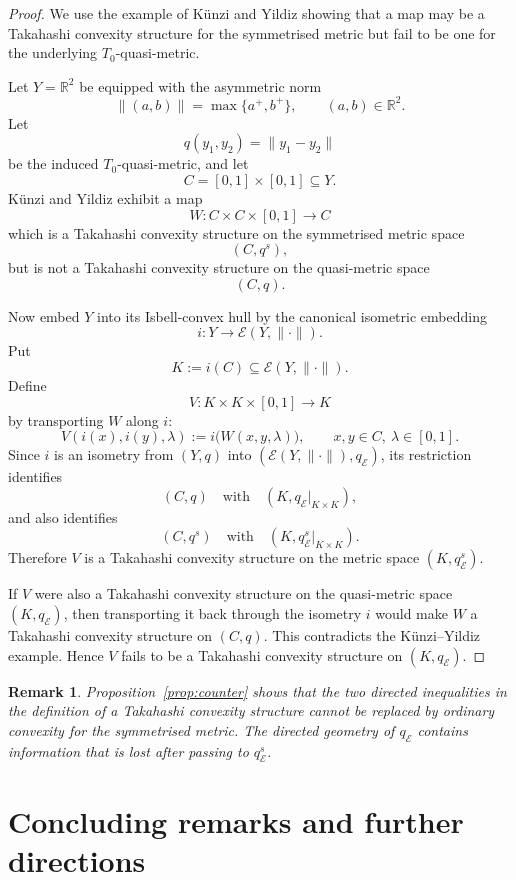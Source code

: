 \documentclass[preprint,12pt]{elsarticle}
\numberwithin{equation}{section}
\newtheorem{remark}[theorem]{Remark}
\newcommand{\E}{\mathcal{E}}
\begin{document}
\begin{proof}
We use the example of K\"unzi and Yildiz showing that a map may be a
Takahashi convexity structure for the symmetrised metric but fail to be one
for the underlying \(T_{0}\)-quasi-metric.

Let \(Y=\mathbb R^{2}\) be equipped with the asymmetric norm
\[
\|(a,b)\|=\max\{a^{+},b^{+}\},
\qquad (a,b)\in\mathbb R^{2}.
\]
Let
\[
q(y_1,y_2)=\|y_1-y_2\|
\]
be the induced \(T_{0}\)-quasi-metric, and let
\[
C=[0,1]\times[0,1]\subseteq Y.
\]
K\"unzi and Yildiz exhibit a map
\[
W:C\times C\times[0,1]\longrightarrow C
\]
which is a Takahashi convexity structure on the symmetrised metric space
\[
(C,q^{s}),
\]
but is not a Takahashi convexity structure on the quasi-metric space
\[
(C,q).
\]

Now embed \(Y\) into its Isbell-convex hull by the canonical isometric
embedding
\[
i:Y\longrightarrow \E(Y,\|\cdot\|).
\]
Put
\[
K:=i(C)\subseteq \E(Y,\|\cdot\|).
\]
Define
\[
V:K\times K\times[0,1]\longrightarrow K
\]
by transporting \(W\) along \(i\):
\[
V(i(x),i(y),\lambda):=i\bigl(W(x,y,\lambda)\bigr),
\qquad x,y\in C,\ \lambda\in[0,1].
\]
Since \(i\) is an isometry from \((Y,q)\) into
\((\E(Y,\|\cdot\|),q_{\E})\), its restriction identifies
\[
(C,q)
\quad\text{with}\quad
(K,q_{\E}|_{K\times K}),
\]
and also identifies
\[
(C,q^{s})
\quad\text{with}\quad
(K,q_{\E}^{s}|_{K\times K}).
\]
Therefore \(V\) is a Takahashi convexity structure on the metric space
\((K,q_{\E}^{s})\).

If \(V\) were also a Takahashi convexity structure on the quasi-metric space
\((K,q_{\E})\), then transporting it back through the isometry \(i\) would make
\(W\) a Takahashi convexity structure on \((C,q)\).  This contradicts the
K\"unzi--Yildiz example.  Hence \(V\) fails to be a Takahashi convexity
structure on \((K,q_{\E})\).
\end{proof}

\begin{remark}\label{rem:counter-meaning}
Proposition~\ref{prop:counter} shows that the two directed inequalities in
the definition of a Takahashi convexity structure cannot be replaced by
ordinary convexity for the symmetrised metric.  The directed geometry of
\(q_{\E}\) contains information that is lost after passing to \(q_{\E}^{s}\).
\end{remark}




\section{Concluding remarks and further directions}
\label{sec:conclusion}
\end{document}
